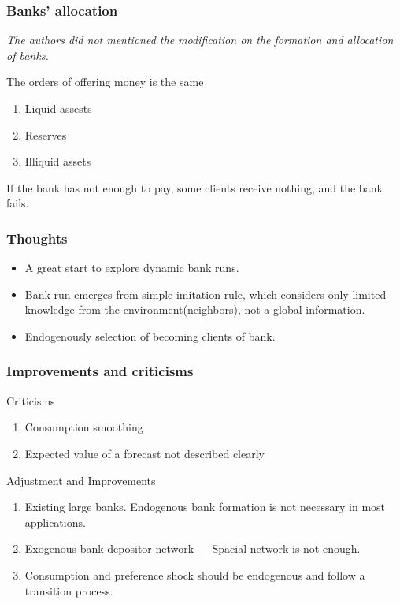 \begin{frame}
    \frametitle{Banks' allocation}

    \emph{The authors did not mentioned the modification on the formation and allocation of banks.}

    The orders of offering money is the same 
    \begin{enumerate}
        \item Liquid assests
        \item Reserves 
        \item Illiquid assets
    \end{enumerate}

    If the bank has not enough to pay, some clients receive nothing, and the bank fails.
\end{frame}

\begin{frame}
    \frametitle{Thoughts}

    \begin{itemize}[<+->]
        \item A great start to explore dynamic bank runs.
        \item Bank run emerges from simple imitation rule, which considers only limited knowledge from the environment(neighbors), not a global information.
        \item Endogenously selection of becoming clients of bank.
    \end{itemize}
\end{frame}

\begin{frame}
    \frametitle{Improvements and criticisms}
    \pause
    Criticisms
    \begin{enumerate}[<+->]

        \item Consumption smoothing
        \item Expected value of a forecast not described clearly
    \end{enumerate}
    \vfill
    Adjustment and Improvements
    \begin{enumerate}
        \item Existing large banks. Endogenous bank formation is not necessary in most applications. 
        \item Exogenous bank-depositor network --- Spacial network is not enough.
        \item Consumption and preference shock should be endogenous and follow a transition process.
    \end{enumerate}

\end{frame}